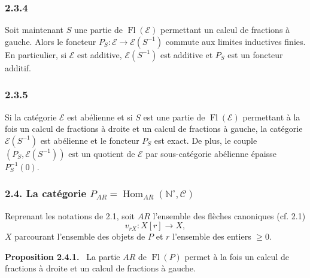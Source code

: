 \documentclass[11pt]{article}
\providecommand{\NN}{\mathbb{N}}
\newenvironment{statement}[1]{\par\medskip\noindent\textbf{#1.}\ }{\par\medskip}
\DeclareMathOperator{\Hom}{Hom}
\providecommand{\Hom}{\operatorname{Hom}}
\providecommand{\Fl}{\operatorname{Fl}}
\providecommand{\NN}{\mathbb N}
\providecommand{\cC}{\mathcal C}
\providecommand{\cE}{\mathcal E}
\begin{document}
\subsubsection*{2.3.4}
Soit maintenant $S$ une partie de $\Fl(\cE)$ permettant un calcul de fractions à gauche. Alors le foncteur $P_S:\cE\to\cE(S^{-1})$ commute aux limites inductives finies. En particulier, si $\cE$ est additive, $\cE(S^{-1})$ est additive et $P_S$ est un foncteur additif.

\subsubsection*{2.3.5}
Si la catégorie $\cE$ est abélienne et si $S$ est une partie de $\Fl(\cE)$ permettant à la fois un calcul de fractions à droite et un calcul de fractions à gauche, la catégorie $\cE(S^{-1})$ est abélienne et le foncteur $P_S$ est exact. De plus, le couple $(P_S,\cE(S^{-1}))$ est un quotient de $\cE$ par sous-catégorie abélienne épaisse $P_S^{-1}(0)$.

\subsubsection*{2.4. La catégorie $P_{AR}=\Hom_{AR}(\NN^\circ,\cC)$}
Reprenant les notations de 2.1, soit $AR$ l'ensemble des flèches canoniques (cf. 2.1)
\[
v_{rX}:X[r]\longrightarrow X,
\]
$X$ parcourant l'ensemble des objets de $P$ et $r$ l'ensemble des entiers $\ge0$.

\begin{statement}{Proposition 2.4.1}
La partie $AR$ de $\Fl(P)$ permet à la fois un calcul de fractions à droite et un calcul de fractions à gauche.
\end{statement}
\end{document}
